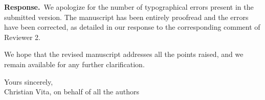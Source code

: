 \documentclass[11pt]{article}
\newcommand{\answer}{\textbf{Response.}\ }
\begin{document}
\answer We apologize for the number of typographical errors present in the submitted version. The manuscript has been entirely proofread and the errors have been corrected, as detailed in our response to the corresponding comment of Reviewer 2.

\bigskip

\noindent
We hope that the revised manuscript addresses all the points raised, and we remain available for any further clarification.

\bigskip

\noindent
Yours sincerely,\\
Christian Vita, on behalf of all the authors
\end{document}

